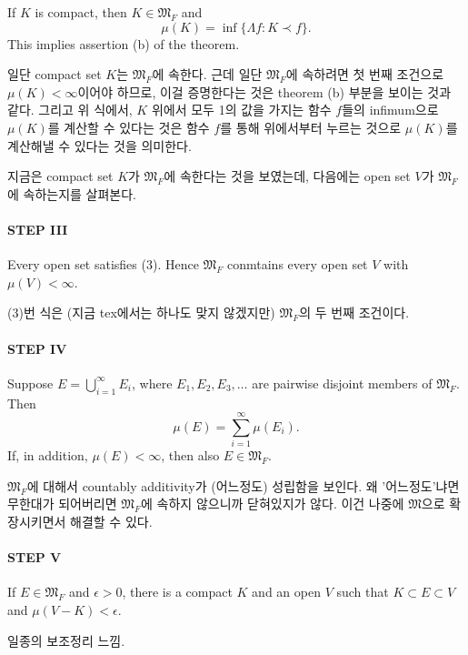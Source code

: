 \documentclass[11pt,reqno]{amsart}
\renewcommand{\(}{\left(}
\renewcommand{\)}{\right)}
\renewcommand{\[}{\left[}
\renewcommand{\]}{\right]}
\newcommand{\ep}{\epsilon}
\newcommand{\M}{\mathfrak{M}}
\begin{document}
If $K$ is compact, then $K \in \M_F$ and
\begin{equation}
  \mu(K) = \inf \{ \Lambda f : K \prec f \}.
\end{equation}
This implies assertion (b) of the theorem.

일단 compact set $K$는 $\M_F$에 속한다. 근데 일단 $\M_F$에 속하려면 첫 번째 조건으로 $\mu (K) < \infty$이어야 하므로, 이걸 
증명한다는 것은 theorem (b) 부분을 보이는 것과 같다. 그리고 위 식에서, $K$ 위에서 모두 1의 값을 가지는 함수 $f$들의 infimum으로 
$\mu(K)$를 계산할 수 있다는 것은 함수 $f$를 통해 위에서부터 누르는 것으로 $\mu(K)$를 계산해낼 수 있다는 것을 의미한다.

지금은 compact set $K$가 $\M_F$에 속한다는 것을 보였는데, 다음에는 open set $V$가 $\M_F$에 속하는지를 살펴본다.

\paragraph{STEP III}

Every open set satisfies (3). Hence $\M_F$ conmtains every open set $V$ with $\mu(V) < \infty$.

(3)번 식은 (지금 tex에서는 하나도 맞지 않겠지만) $\M_F$의 두 번째 조건이다.

\paragraph{STEP IV}

Suppose $E = \bigcup _{i=1}^\infty E _i$, where $E_1, E_2, E_3, \dots$ are pairwise disjoint members of $\M_F$. Then
\begin{equation}
  \mu(E) = \sum _{i=1}^\infty \mu (E_i).
\end{equation}
If, in addition, $\mu (E) < \infty$, then also $E \in \M_F$.

$\M_F$에 대해서 countably additivity가 (어느정도) 성립함을 보인다. 왜 '어느정도'냐면 무한대가 되어버리면 $\M_F$에 속하지 않으니까
닫혀있지가 않다. 이건 나중에 $\M$으로 확장시키면서 해결할 수 있다.

\paragraph{STEP V}

If $E \in \M_F$ and $\ep > 0$, there is a compact $K$ and an open $V$ such that $K \subset E \subset V$ and $\mu(V - K) < \ep$.

일종의 보조정리 느낌.
\end{document}
